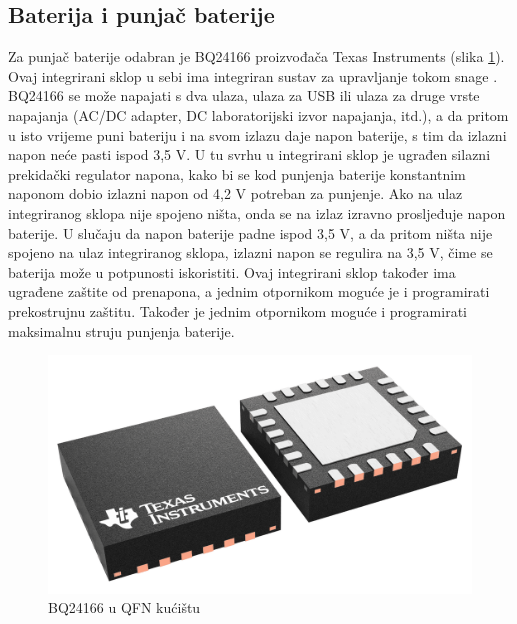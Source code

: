 \subsection{Baterija i punjač baterije}
Za punjač baterije odabran je BQ24166 proizvođača Texas Instruments (slika \ref{slk:BQ24166}). Ovaj integrirani sklop u sebi ima integriran sustav za upravljanje tokom snage \cite{ti:bq24166}. BQ24166 se može napajati s dva ulaza, ulaza za USB ili ulaza za druge vrste napajanja (AC/DC adapter, DC laboratorijski izvor napajanja, itd.), a da pritom u isto vrijeme puni bateriju i na svom izlazu daje napon baterije, s tim da izlazni napon neće pasti ispod 3,5 V. U tu svrhu u integrirani sklop je ugrađen silazni prekidački regulator napona, kako bi se kod punjenja baterije konstantnim naponom dobio izlazni napon od 4,2 V potreban za punjenje. Ako na ulaz integriranog sklopa nije spojeno ništa, onda se na izlaz izravno prosljeđuje napon baterije. U slučaju da napon baterije padne ispod 3,5 V, a da pritom ništa nije spojeno na ulaz integriranog sklopa, izlazni napon se regulira na 3,5 V, čime se baterija može u potpunosti iskoristiti. Ovaj integrirani sklop također ima ugrađene zaštite od prenapona, a jednim otpornikom moguće je i programirati prekostrujnu zaštitu. Također je jednim otpornikom moguće i programirati maksimalnu struju punjenja baterije.
\begin{figure}[!hbtp]
    \centering
    \includegraphics[width = 6 cm]{Figures/bq24166.png}
    \caption{BQ24166 u QFN kućištu}
    \label{slk:BQ24166}
\end{figure}

